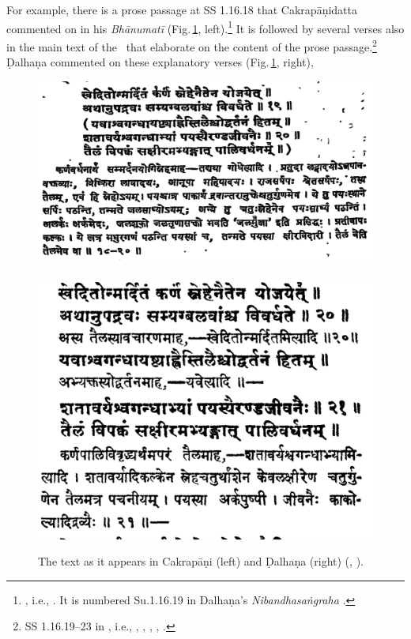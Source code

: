 For example, there is a prose passage at SS 1.16.18 that
Cakrapāṇidatta commented on in his \emph{Bhānumatī} (Fig.\,\ref{fig:yavasva},
left).\footnote{\cite[130]{acar-1939}, i.e., . It is numbered Su.1.16.19 in Dalhaṇa's
    \emph{Nibandhasaṅgraha} \citep[79]{vulgate}.} It is followed by several verses
    also in the main text  of the \SS\ that elaborate on the content of the prose
    passage.\footnote{SS 1.16.19--23 in \cite{acar-1939}, i.e., ,
        , , , .} %
        Ḍalhaṇa commented on these explanatory verses (Fig.\,\ref{fig:yavasva},
        right),
\begin{figure}[t]
    \centering
    \includegraphics[draft=false,width=.58\textwidth]{media/yavasva-cakra-upscaled}\
    \includegraphics[draft=false,width=.41\textwidth]{media/yavasva-dalhana-upscaled}
    \caption{The text as it appears in Cakrapāṇi (left) and Ḍalhaṇa (right)  
    (\cite[130]{acar-1939}, \cite[79]{vulgate}).}
    \label{fig:yavasva}
\end{figure}
